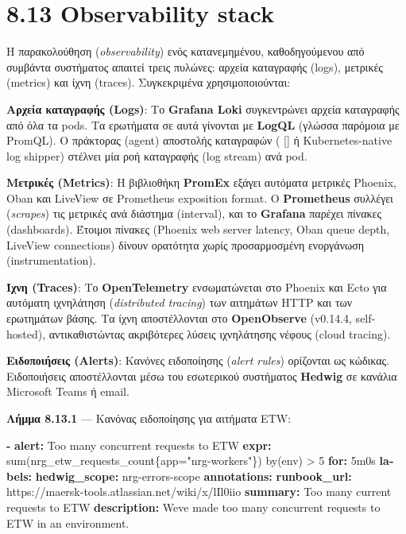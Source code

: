 \documentclass[11pt,a4paper,greek,twoside]{template-xe}
\let\origtexttt\texttt
\renewcommand{\texttt}[1]{%
  \begingroup
  \StrSubstitute{#1}{.}{.\allowbreak}[\tttmp]%
  \origtexttt{\tttmp}%
  \endgroup
}
\newenvironment{Shaded}{\begin{english}\begin{snugshade}}{\end{snugshade}\end{english}}
\newcommand{\AttributeTok}[1]{\textcolor[rgb]{0.13,0.29,0.53}{#1}}
\newcommand{\FunctionTok}[1]{\textcolor[rgb]{0.13,0.29,0.53}{\textbf{#1}}}
\newcommand{\KeywordTok}[1]{\textcolor[rgb]{0.13,0.29,0.53}{\textbf{#1}}}
\begin{document}
\section{8.13 Observability stack}\label{observability-stack}

Η παρακολούθηση (\emph{observability}) ενός κατανεμημένου,
καθοδηγούμενου από συμβάντα συστήματος απαιτεί τρεις πυλώνες: αρχεία
καταγραφής (logs), μετρικές (metrics) και ίχνη (traces). Συγκεκριμένα
χρησιμοποιούνται:

\textbf{Αρχεία καταγραφής (Logs)}: Το \textbf{Grafana Loki} συγκεντρώνει
αρχεία καταγραφής από όλα τα pods. Τα ερωτήματα σε αυτά γίνονται με
\textbf{LogQL} (γλώσσα παρόμοια με PromQL). Ο πράκτορας (agent)
αποστολής καταγραφών (\texttt{promtail} ή Kubernetes-native log shipper)
στέλνει μία ροή καταγραφής (log stream) ανά pod.

\textbf{Μετρικές (Metrics)}: Η βιβλιοθήκη \textbf{PromEx} εξάγει
αυτόματα μετρικές Phoenix, Oban και LiveView σε Prometheus exposition
format. Ο \textbf{Prometheus} συλλέγει (\emph{scrapes}) τις μετρικές ανά
διάστημα (interval), και το \textbf{Grafana} παρέχει πίνακες
(dashboards). Έτοιμοι πίνακες (Phoenix web server latency, Oban queue
depth, LiveView connections) δίνουν ορατότητα χωρίς προσαρμοσμένη
ενοργάνωση (instrumentation).

\textbf{Ίχνη (Traces)}: Το \textbf{OpenTelemetry} ενσωματώνεται στο
Phoenix και Ecto για αυτόματη ιχνηλάτηση (\emph{distributed tracing})
των αιτημάτων HTTP και των ερωτημάτων βάσης. Τα ίχνη αποστέλλονται στο
\textbf{OpenObserve} (v0.14.4, self-hosted), αντικαθιστώντας ακριβότερες
λύσεις ιχνηλάτησης νέφους (cloud tracing).

\textbf{Ειδοποιήσεις (Alerts)}: Κανόνες ειδοποίησης (\emph{alert rules})
ορίζονται ως κώδικας. Ειδοποιήσεις αποστέλλονται μέσω του εσωτερικού
συστήματος \textbf{Hedwig} σε κανάλια Microsoft Teams ή email.

\textbf{Λήμμα 8.13.1} --- Κανόνας ειδοποίησης για αιτήματα ETW:

\begin{Shaded}
\begin{Highlighting}[]
\KeywordTok{{-}}\AttributeTok{ }\FunctionTok{alert}\KeywordTok{:}\AttributeTok{ Too many concurrent requests to ETW}
\AttributeTok{  }\FunctionTok{expr}\KeywordTok{:}\AttributeTok{ sum(nrg\_etw\_requests\_count\{app="nrg{-}workers"\}) by(env) \textgreater{} 5}
\AttributeTok{  }\FunctionTok{for}\KeywordTok{:}\AttributeTok{ 5m0s}
\AttributeTok{  }\FunctionTok{labels}\KeywordTok{:}
\AttributeTok{    }\FunctionTok{hedwig\_scope}\KeywordTok{:}\AttributeTok{ nrg{-}errors{-}scope}
\AttributeTok{  }\FunctionTok{annotations}\KeywordTok{:}
\AttributeTok{    }\FunctionTok{runbook\_url}\KeywordTok{:}\AttributeTok{ https://maersk{-}tools.atlassian.net/wiki/x/lIl0iio}
\AttributeTok{    }\FunctionTok{summary}\KeywordTok{:}\AttributeTok{ Too many current requests to ETW}
\AttributeTok{    }\FunctionTok{description}\KeywordTok{:}\AttributeTok{ We\textquotesingle{}ve made too many concurrent requests to ETW in an environment.}
\end{Highlighting}
\end{Shaded}
\end{document}
